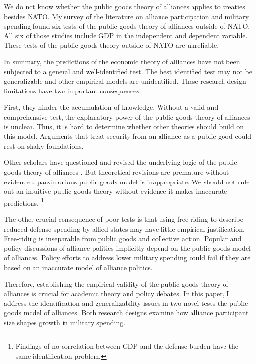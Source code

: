\documentclass[12pt]{article}
\begin{document}
We do not know whether the public goods theory of alliances applies to treaties besides NATO. 
My survey of the literature on alliance participation and military spending found six tests of the public goods theory of alliances outside of NATO. 
All six of those studies include GDP in the independent and dependent variable. 
These tests of the public goods theory outside of NATO are unreliable. 


In summary, the predictions of the economic theory of alliances have not been subjected to a general and well-identified test. 
The best identified test may not be generalizable and other empirical models are unidentified. 
These research design limitations have two important consequences.

 
First, they hinder the accumulation of knowledge. 
Without a valid and comprehensive test, the explanatory power of the public goods theory of alliances is unclear. 
Thus, it is hard to determine whether other theories should build on this model. 
Arguments that treat security from an alliance as a public good could rest on shaky foundations. 


Other scholars have questioned and revised the underlying logic of the public goods theory of alliances \citep{Palmer1990, SandlerHartley2001}.  
But theoretical revisions are premature without evidence a parsimonious public goods model is inappropriate. 
We should not rule out an intuitive public goods theory without evidence it makes inaccurate predictions.
\footnote{Findings of no correlation between GDP and the defense burden have the same identification problem.} 


The other crucial consequence of poor tests is that using free-riding to describe reduced defense spending by allied states may have little empirical justification. 
Free-riding is inseparable from public goods and collective action. 
Popular and policy discussions of alliance politics implicitly depend on the public goods model of alliances. 
Policy efforts to address lower military spending could fail if they are based on an inaccurate model of alliance politics. 


Therefore, establishing the empirical validity of the public goods theory of alliances is crucial for academic theory and policy debates.
In this paper, I address the identification and generalizability issues in two novel tests the public goods model of alliances.  
Both research designs examine how alliance participant size shapes growth in military spending. 
\end{document}

